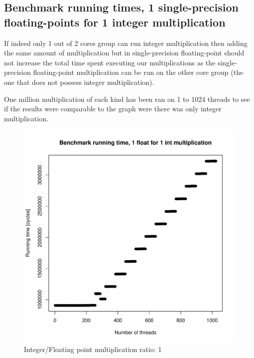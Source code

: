 \documentclass{article}
\def \scalingfactor{.8}
\begin{document}
	\subsection{Benchmark running times, 1 single-precision floating-points for 1 integer multiplication}
	If indeed only 1 out of 2 cores group can run integer multiplication then adding the same amount of multiplication but in single-precision floating-point should not increase the total time spent executing our multiplications as the single-precision floating-point multiplication can be run on the other core group (the one that does not possess integer multiplication).
	
	One million multiplication of each kind has been ran on 1 to 1024 threads to see if the results were comparable to the graph were there was only integer multiplication.
	\begin{figure}[h]
		\centering
		\vspace{-20pt}
    			\includegraphics[width=\scalingfactor\linewidth]{"graphics/running_times_ratio11"}
		\vspace{-15pt}
		\caption{Integer/Floating point multiplication ratio: 1}
	\end{figure}
	\pagebreak
\end{document}

